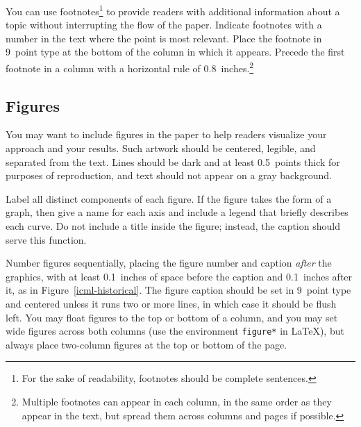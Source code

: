 \documentclass{article}
\begin{document}
You can use footnotes\footnote{For the sake of readability, footnotes
should be complete sentences.} to provide readers with additional
information about a topic without interrupting the flow of the paper. 
Indicate footnotes with a number in the text where the point is most
relevant. Place the footnote in 9~point type at the bottom of the
column in which it appears. Precede the first footnote in a column
with a horizontal rule of 0.8~inches.\footnote{Multiple footnotes can
appear in each column, in the same order as they appear in the text,
but spread them across columns and pages if possible.}


\subsection{Figures}
 
You may want to include figures in the paper to help readers visualize
your approach and your results. Such artwork should be centered,
legible, and separated from the text. Lines should be dark and at
least 0.5~points thick for purposes of reproduction, and text should
not appear on a gray background.

Label all distinct components of each figure. If the figure takes the
form of a graph, then give a name for each axis and include a legend
that briefly describes each curve. Do not include a title inside the
figure; instead, the caption should serve this function.

Number figures sequentially, placing the figure number and caption
{\it after\/} the graphics, with at least 0.1~inches of space before
the caption and 0.1~inches after it, as in
Figure~\ref{icml-historical}.  The figure caption should be set in
9~point type and centered unless it runs two or more lines, in which
case it should be flush left.  You may float figures to the top or
bottom of a column, and you may set wide figures across both columns
(use the environment {\tt figure*} in \LaTeX), but always place
two-column figures at the top or bottom of the page.
\end{document}

